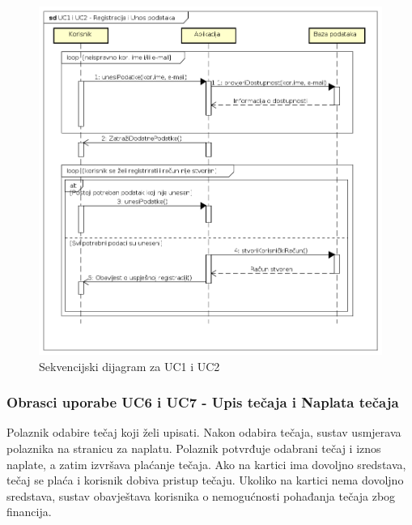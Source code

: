 					\begin{figure}[h]
						\includegraphics[scale=0.63]{dijagrami/UML_sd_UC1UC2.PNG}
						\centering
						\caption{Sekvencijski dijagram za UC1 i UC2}
						\label{fig:UML_sd_UC1UC2}
					\end{figure}
				
				\eject
				\subsubsection{Obrasci uporabe UC6 i UC7 - Upis tečaja i Naplata tečaja}
				
					Polaznik odabire tečaj koji želi upisati. Nakon odabira tečaja, sustav usmjerava polaznika na stranicu za naplatu. \newline
					Polaznik potvrđuje odabrani tečaj i iznos naplate, a zatim izvršava plaćanje tečaja. Ako na kartici ima dovoljno sredstava, tečaj se plaća i korisnik dobiva pristup tečaju. Ukoliko na kartici nema dovoljno sredstava, sustav obavještava korisnika o nemogućnosti pohađanja tečaja zbog financija.
				
